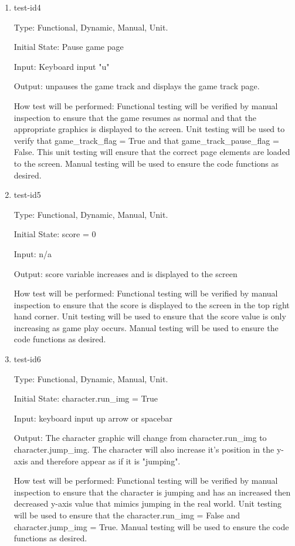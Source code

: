 \documentclass[12pt, titlepage]{article}
\begin{document}
\begin{enumerate}
	\item{test-id4\\}
	
	Type: Functional, Dynamic, Manual, Unit.
	
	Initial State: Pause game page
	
	Input: Keyboard input "u"
	
	Output: unpauses the game track and displays the game track page. 
	
	How test will be performed: Functional testing will be verified by manual inspection to ensure that the game resumes as normal and that the appropriate graphics is displayed to the screen. Unit testing will be used to verify that game\_track\_flag = True and that game\_track\_pause\_flag = False. This unit testing will ensure that the correct page elements are loaded to the screen. Manual testing will be used to ensure the code functions as desired. 
	
	\item{test-id5\\}
	
	Type: Functional, Dynamic, Manual, Unit.
	
	Initial State: score = 0
	
	Input: n/a
	
	Output: score variable increases and is displayed to the screen
	
	How test will be performed: Functional testing will be verified by manual inspection to ensure that the score is displayed to the screen in the top right hand corner. Unit testing will be used to ensure that the score value is only increasing as game play occurs. Manual testing will be used to ensure the code functions as desired.
	
	\item{test-id6\\}
	
	Type: Functional, Dynamic, Manual, Unit.
	
	Initial State: character.run\_img = True
	
	Input: keyboard input up arrow or spacebar
	
	Output: The character graphic will change from character.run\_img to character.jump\_img. The character will also increase it's position in the y-axis and therefore appear as if it is "jumping". 
	
	How test will be performed: Functional testing will be verified by manual inspection to ensure that the character is jumping and has an increased then decreased y-axis value that mimics jumping in the real world. Unit testing will be used to ensure that the character.run\_img = False and character.jump\_img = True. Manual testing will be used to ensure the code functions as desired. 
	

\end{enumerate}
\end{document}
